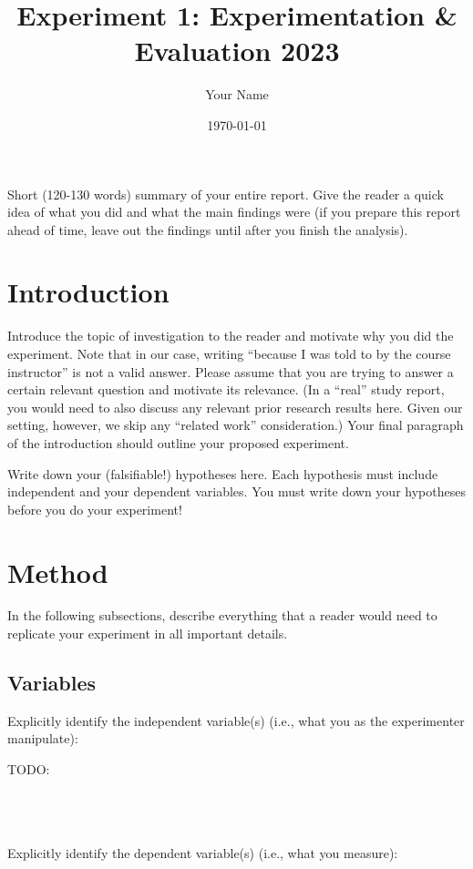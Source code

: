 \documentclass{article}
\title{Experiment 1: Experimentation \& Evaluation 2023}
\author{Your Name}
\date{\today}
\begin{document}
\maketitle

Short (120-130 words) summary of your entire report. Give the reader a quick idea of what you did and what the main findings were (if you prepare this report ahead of time, leave out the findings until after you finish the analysis).


\section{Introduction}
Introduce the topic of investigation to the reader and motivate why you did the experiment. Note that in our case, writing “because I was told to by the course instructor” is not a valid answer. Please assume that you are trying to answer a certain relevant question and motivate its relevance. (In a “real” study report, you would need to also discuss any relevant prior research results here. Given our setting, however, we skip any “related work” consideration.) Your final paragraph of the introduction should outline your proposed experiment.


\begin{tcolorbox}[title=Hypotheses:, colback=white, colframe=black, arc=0pt, outer arc=0pt]
    Write down your (falsifiable!) hypotheses here. Each hypothesis must include independent and your dependent variables. You must write down your hypotheses before you do your experiment!
\end{tcolorbox}

\section{Method}
In the following subsections, describe everything that a reader would need to replicate your experiment in all important details.
\subsection{Variables}
Explicitly identify the independent variable(s) (i.e., what you as the experimenter manipulate): 

\begin{minipage}{0.48\textwidth}
    \begin{tcolorbox}[title=Independent Variable:, colback=white, colframe=black, arc=0pt, outer arc=0pt]
        TODO:
    \end{tcolorbox}
\end{minipage}%
\hfill
\begin{minipage}{0.48\textwidth}
    \begin{tcolorbox}[title=Levels, colback=white, colframe=black, arc=0pt, outer arc=0pt]
        
    \end{tcolorbox}
\end{minipage}
\\\\\\
Explicitly identify the dependent variable(s) (i.e., what you measure):\\
\end{document}
